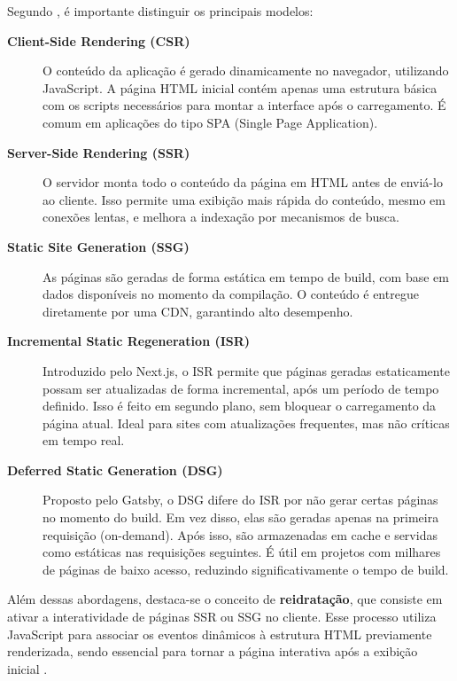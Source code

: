 Segundo , é importante distinguir os principais modelos:


\begin{description}
  \item[\textbf{Client-Side Rendering (CSR)}] 
  O conteúdo da aplicação é gerado dinamicamente no navegador, utilizando JavaScript. A página HTML inicial contém apenas uma estrutura básica com os scripts necessários para montar a interface após o carregamento. É comum em aplicações do tipo SPA (Single Page Application).
  
  \item[\textbf{Server-Side Rendering (SSR)}]
  O servidor monta todo o conteúdo da página em HTML antes de enviá-lo ao cliente. Isso permite uma exibição mais rápida do conteúdo, mesmo em conexões lentas, e melhora a indexação por mecanismos de busca.

  \item[\textbf{Static Site Generation (SSG)}]
  As páginas são geradas de forma estática em tempo de build, com base em dados disponíveis no momento da compilação. O conteúdo é entregue diretamente por uma CDN, garantindo alto desempenho.

  \item[\textbf{Incremental Static Regeneration (ISR)}]
  Introduzido pelo Next.js, o ISR permite que páginas geradas estaticamente possam ser atualizadas de forma incremental, após um período de tempo definido. Isso é feito em segundo plano, sem bloquear o carregamento da página atual. Ideal para sites com atualizações frequentes, mas não críticas em tempo real.

  \item[\textbf{Deferred Static Generation (DSG)}]
  Proposto pelo Gatsby, o DSG difere do ISR por não gerar certas páginas no momento do build. Em vez disso, elas são geradas apenas na primeira requisição (on-demand). Após isso, são armazenadas em cache e servidas como estáticas nas requisições seguintes. É útil em projetos com milhares de páginas de baixo acesso, reduzindo significativamente o tempo de build.
\end{description}

Além dessas abordagens, destaca-se o conceito de \textbf{reidratação}, que consiste em ativar a interatividade de páginas SSR ou SSG no cliente. Esse processo utiliza JavaScript para associar os eventos dinâmicos à estrutura HTML previamente renderizada, sendo essencial para tornar a página interativa após a exibição inicial \cite{osmani2025}.


